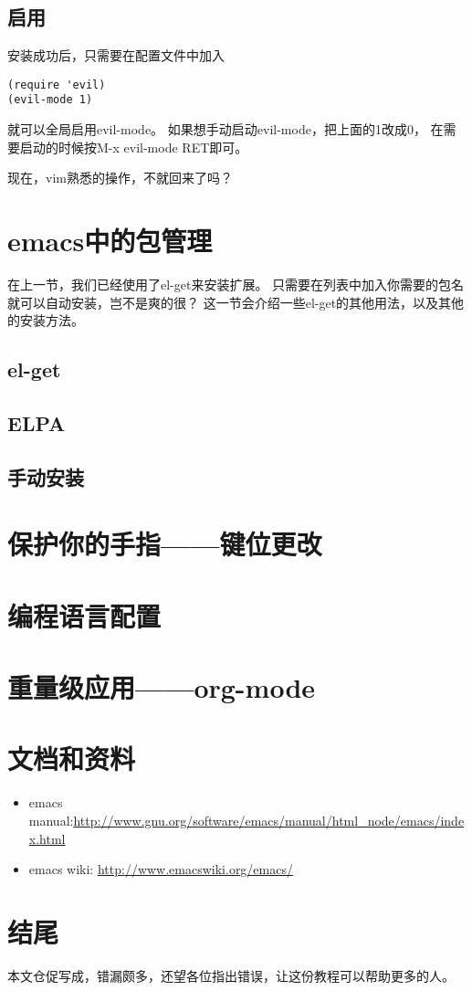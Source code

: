 \documentclass{article}
\begin{document}
\subsection{启用}
\label{sec-6-2}
安装成功后，只需要在配置文件中加入
\begin{verbatim}
(require 'evil)
(evil-mode 1)
\end{verbatim}
就可以全局启用evil-mode。
如果想手动启动evil-mode，把上面的1改成0，
在需要启动的时候按M-x evil-mode RET即可。

现在，vim熟悉的操作，不就回来了吗？
\section{emacs中的包管理}
\label{sec-7}
\label{package-management}
在上一节，我们已经使用了el-get来安装扩展。
只需要在列表中加入你需要的包名就可以自动安装，岂不是爽的很？
这一节会介绍一些el-get的其他用法，以及其他的安装方法。
\subsection{el-get}
\label{sec-7-1}
\subsection{ELPA}
\label{sec-7-2}
\subsection{手动安装}
\label{sec-7-3}
\section{保护你的手指——键位更改}
\label{sec-8}
\section{编程语言配置}
\label{sec-9}
\section{重量级应用——org-mode}
\label{sec-10}
\section{文档和资料}
\label{sec-11}
\label{documents}
\begin{itemize}
\item emacs manual:\url{http://www.gnu.org/software/emacs/manual/html_node/emacs/index.html}
\item emacs wiki: \url{http://www.emacswiki.org/emacs/}
\end{itemize}
\section{结尾}
\label{sec-12}
本文仓促写成，错漏颇多，还望各位指出错误，让这份教程可以帮助更多的人。
\end{document}
